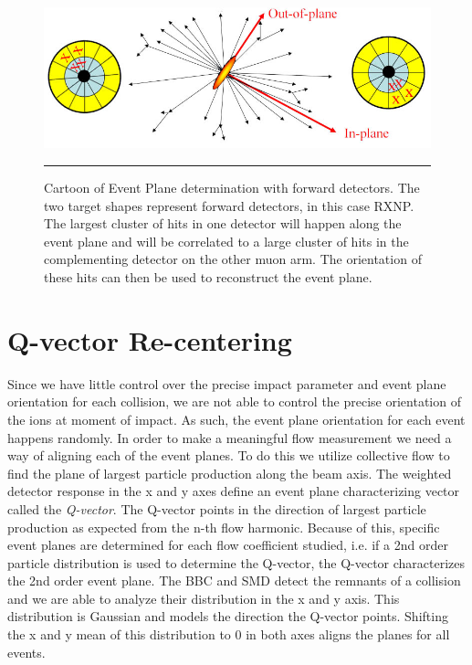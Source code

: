 \begin{figure}[htbp!]
  \centering
    \includegraphics[width=1\textwidth]{Figures/reactionplaneexpcartoon.jpg}
    \rule{35em}{0.5pt}
  \caption[Cartoon of Event Plane determination with forward detectors]{Cartoon of Event Plane determination with forward detectors. The two target shapes represent forward detectors, in this case RXNP. The largest cluster of hits in one detector will happen along the event plane and will be correlated to a large cluster of hits in the complementing detector on the other muon arm. The orientation of these hits can then be used to reconstruct the event plane.\citep{RXNPfocus}}
  \label{fig:rxnpexpcartoon}
\end{figure}



\section{Q-vector Re-centering}
Since we have little control over the precise impact parameter and event plane orientation for each collision, we are not able to control the precise orientation of the ions at moment of impact. As such, the event plane orientation for each event happens randomly. In order to make a meaningful flow measurement we need a way of aligning each of the event planes. To do this we utilize collective flow to find the plane of largest particle production along the beam axis. The weighted detector response in the x and y axes define an event plane characterizing vector called the \textit{Q-vector}. The Q-vector points in the direction of largest particle production as expected from the n-th flow harmonic. Because of this, specific event planes are determined for each flow coefficient studied, i.e. if a 2nd order particle distribution is used to determine the Q-vector, the Q-vector characterizes the 2nd order event plane. The BBC and SMD detect the remnants of a collision and we are able to analyze their distribution in the x and y axis. This distribution is Gaussian and models the direction the Q-vector points. Shifting the x and y mean of this distribution to 0 in both axes aligns the planes for all events.

